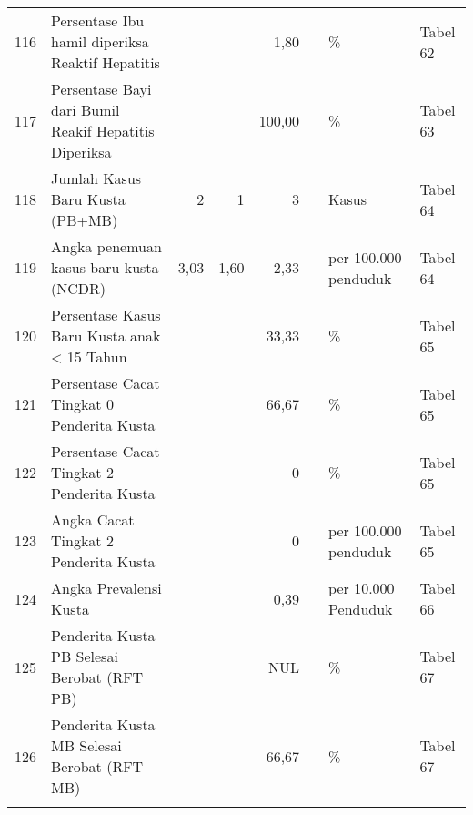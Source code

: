 \begin{small}
\begin{longtable}{rY{12em}rrrrY{5em}Y{5em}}
	116 & Persentase Ibu hamil diperiksa Reaktif Hepatitis                            &        &        &               1,80 &          & \%                             & Tabel 62 \\
	117 & Persentase Bayi dari Bumil Reakif Hepatitis Diperiksa                       &        &        &             100,00 &          & \%                             & Tabel 63 \\
	118 & Jumlah Kasus Baru Kusta (PB+MB)                                             &      2 &      1 &                  3 &          & Kasus                          & Tabel 64 \\
	119 & Angka penemuan kasus baru kusta (NCDR)                                      &   3,03 &   1,60 &               2,33 &          & per 100.000 penduduk           & Tabel 64 \\
	120 & Persentase Kasus Baru Kusta anak < 15 Tahun                                 &        &        &              33,33 &          & \%                             & Tabel 65 \\
	121 & Persentase Cacat Tingkat 0 Penderita Kusta                                  &        &        &              66,67 &          & \%                             & Tabel 65 \\
	122 & Persentase Cacat Tingkat 2 Penderita Kusta                                  &        &        &                  0 &          & \%                             & Tabel 65 \\
	123 & Angka Cacat Tingkat 2 Penderita Kusta                                       &        &        &                  0 &          & per 100.000 penduduk           & Tabel 65 \\
	124 & Angka Prevalensi Kusta                                                      &        &        &               0,39 &          & per 10.000 Penduduk            & Tabel 66 \\
	125 & Penderita Kusta PB Selesai Berobat (RFT PB)                                 &        &        &                NUL &          & \%                             & Tabel 67 \\
	126 & Penderita Kusta MB Selesai Berobat (RFT MB)                                 &        &        &              66,67 &          & \%                             & Tabel 67 \\
	&                                                                                 &        &        &                    &          &                                &          \\

\end{longtable}
\end{small}
